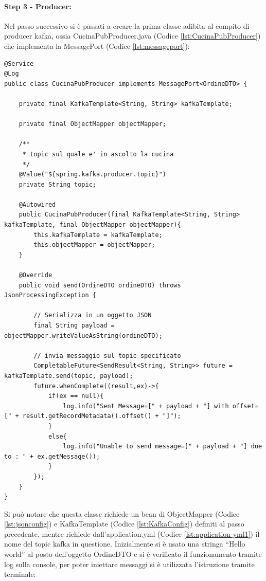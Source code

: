 \paragraph{Step 3 - Producer:}
Nel passo successivo si è passati a creare la prima classe adibita al compito di producer kafka, ossia CucinaPubProducer.java (Codice \vref{lst:CucinaPubProducer}) che implementa la MessagePort (Codice \vref{lst:messageport}):
\begin{lstlisting}[style=myJava, 
    caption={Classe del producer kafka CucinaPubProducer.java}, label=lst:CucinaPubProducer, 
    emph={[2] kafkaTemplate , objectMapper, topic, payload, log },
    emphstyle={[2]\color{codeDarkMagenta}}]
@Service
@Log
public class CucinaPubProducer implements MessagePort<OrdineDTO> {

    private final KafkaTemplate<String, String> kafkaTemplate;

    private final ObjectMapper objectMapper;

    /**
     * topic sul quale e' in ascolto la cucina
     */
    @Value("${spring.kafka.producer.topic}")
    private String topic;

    @Autowired
    public CucinaPubProducer(final KafkaTemplate<String, String> kafkaTemplate, final ObjectMapper objectMapper){
        this.kafkaTemplate = kafkaTemplate;
        this.objectMapper = objectMapper;
    }

    @Override
    public void send(OrdineDTO ordineDTO) throws JsonProcessingException {

        // Serializza in un oggetto JSON
        final String payload = objectMapper.writeValueAsString(ordineDTO);

        // invia messaggio sul topic specificato
        CompletableFuture<SendResult<String, String>> future = kafkaTemplate.send(topic, payload);
        future.whenComplete((result,ex)->{
            if(ex == null){
                log.info("Sent Message=[" + payload + "] with offset=[" + result.getRecordMetadata().offset() + "]");
            }
            else{
                log.info("Unable to send message=[" + payload + "] due to : " + ex.getMessage());
            }
        });
    }
}
\end{lstlisting}
Si può notare che questa classe richiede un bean di ObjectMapper (Codice \vref{lst:jsonconfig}) e KafkaTemplate (Codice \vref{lst:KafkaConfig}) definiti al passo precedente, mentre richiede dall’application.yml (Codice \vref{lst:application-yml1}) il nome del topic kafka in questione.
Inizialmente si è usato una stringa “Hello world” al posto dell’oggetto OrdineDTO e si è verificato il funzionamento tramite log sulla console, per poter iniettare messaggi si è utilizzata l’istruzione tramite terminale:
